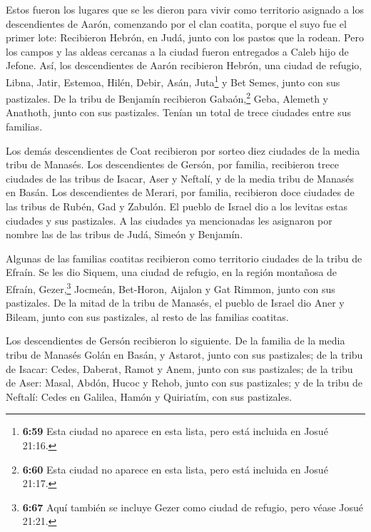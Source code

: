  Estos fueron los lugares que se les dieron para vivir
como territorio asignado a los descendientes de Aarón, comenzando por el
clan coatita, porque el suyo fue el primer lote: 
Recibieron Hebrón, en Judá, junto con los pastos que la rodean.
 Pero los campos y las aldeas cercanas a la ciudad fueron
entregados a Caleb hijo de Jefone.  Así, los
descendientes de Aarón recibieron Hebrón, una ciudad de refugio, Libna,
Jatir, Estemoa,  Hilén, Debir,  Asán,
Juta\footnote{\textbf{6:59} Esta ciudad no aparece en esta lista, pero
  está incluida en Josué 21:16.} y Bet Semes, junto con sus pastizales.
 De la tribu de Benjamín recibieron Gabaón,\footnote{\textbf{6:60}
  Esta ciudad no aparece en esta lista, pero está incluida en Josué
  21:17.} Geba, Alemeth y Anathoth, junto con sus pastizales. Tenían un
total de trece ciudades entre sus familias.

 Los demás descendientes de Coat recibieron por sorteo
diez ciudades de la media tribu de Manasés.  Los
descendientes de Gersón, por familia, recibieron trece ciudades de las
tribus de Isacar, Aser y Neftalí, y de la media tribu de Manasés en
Basán.  Los descendientes de Merari, por familia,
recibieron doce ciudades de las tribus de Rubén, Gad y Zabulón.
 El pueblo de Israel dio a los levitas estas ciudades y
sus pastizales.  A las ciudades ya mencionadas les
asignaron por nombre las de las tribus de Judá, Simeón y Benjamín.

 Algunas de las familias coatitas recibieron como
territorio ciudades de la tribu de Efraín.  Se les dio
Siquem, una ciudad de refugio, en la región montañosa de Efraín,
Gezer,\footnote{\textbf{6:67} Aquí también se incluye Gezer como ciudad
  de refugio, pero véase Josué 21:21.}  Jocmeán,
Bet-Horon,  Aijalon y Gat Rimmon, junto con sus
pastizales.  De la mitad de la tribu de Manasés, el
pueblo de Israel dio Aner y Bileam, junto con sus pastizales, al resto
de las familias coatitas.

 Los descendientes de Gersón recibieron lo siguiente. De
la familia de la media tribu de Manasés Golán en Basán, y Astarot, junto
con sus pastizales;  de la tribu de Isacar: Cedes,
Daberat,  Ramot y Anem, junto con sus pastizales;
 de la tribu de Aser: Masal, Abdón,  Hucoc
y Rehob, junto con sus pastizales;  y de la tribu de
Neftalí: Cedes en Galilea, Hamón y Quiriatím, con sus pastizales.

